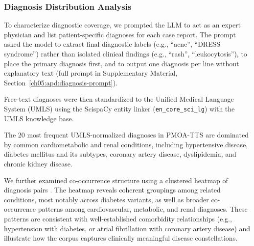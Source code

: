 \subsubsection{Diagnosis Distribution Analysis}
\label{ch05:diagnosis-distribution-analysis}

To characterize diagnostic coverage, we prompted the LLM to act as an expert physician and list patient-specific diagnoses for each case report. 
The prompt asked the model to extract final diagnostic labels (e.g., ``acne'', ``DRESS syndrome'') rather than isolated clinical findings (e.g., ``rash'', ``leukocytosis''), to place the primary diagnosis first, and to output one diagnosis per line without explanatory text (full prompt in Supplementary Material, Section~\ref{ch05:apd:diagnosis-prompt}).

Free-text diagnoses were then standardized to the Unified Medical Language System (UMLS) using the ScispaCy entity linker (\texttt{en\_core\_sci\_lg}) with the UMLS knowledge base. 

The 20 most frequent UMLS-normalized diagnoses in PMOA-TTS are dominated by common cardiometabolic and renal conditions, including hypertensive disease, diabetes mellitus and its subtypes, coronary artery disease, dyslipidemia, and chronic kidney disease.

We further examined co-occurrence structure using a clustered heatmap of diagnosis pairs \citep[Data Overview: Diagnosis Distribution Analysis]{noroozizadeh-pmoa-tts-v4}.
The heatmap reveals coherent groupings among related conditions, most notably across diabetes variants, as well as broader co-occurrence patterns among cardiovascular, metabolic, and renal diagnoses.
These patterns are consistent with well-established comorbidity relationships (e.g., hypertension with diabetes, or atrial fibrillation with coronary artery disease) and illustrate how the corpus captures clinically meaningful disease constellations.

